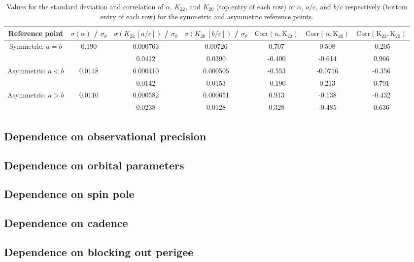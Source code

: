 \documentclass[linenumbers]{aastex631}
\begin{document}
\begin{table}
  \centering
  \begin{tabular}{c c c c c c c}
    \hline \hline
    Reference point & $\sigma(\alpha)$ / $\sigma_\theta$ & $\sigma(K_{22}\ [a/c])$ / $\sigma_\theta$ & $\sigma(K_{20}\ [b/c])$ / $\sigma_\theta$ & $\mathrm{Corr(\alpha, K_{22})}$ & $\mathrm{Corr(\alpha, K_{20})}$ & $\mathrm{Corr(K_{22}, K_{20})}$ \\ \hline
    Symmetric: $a=b$ & 0.190 & 0.000763 & 0.00726 & 0.707 & 0.508 & -0.205\\
    & & 0.0412 & 0.0390 & -0.400 & -0.614 & 0.966\\
    Asymmetric: $a<b$ & 0.0148 & 0.000410 & 0.000505 & -0.553 & -0.0716 & -0.356\\
    & & 0.0142 & 0.0153 & -0.190 & 0.213 & 0.791\\
    Asymmetric: $a>b$ & 0.0110 & 0.000582 & 0.000651 & 0.913 & -0.138 & -0.432\\ 
    & & 0.0238 & 0.0128 & 0.328 & -0.485 & 0.636\\ \hline
  \end{tabular}
  \caption{Values for the standard deviation and correlation of $\alpha$, $K_{22}$, and $K_{20}$ (top entry of each row) or $\alpha$, $a/c$, and $b/c$ respectively (bottom entry of each row) for the symmetric and asymmetric reference points.}
  \label{tab:probe-space-refernece-var-covar}
\end{table}


\subsection{Dependence on observational precision}

\subsection{Dependence on orbital parameters}

\subsection{Dependence on spin pole}

\subsection{Dependence on cadence}

\subsection{Dependence on blocking out perigee}
\end{document}
